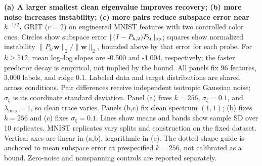 \textbf{(a) A larger smallest clean eigenvalue improves recovery; (b) more noise increases instability; (c) more pairs reduce subspace error near $k^{-1/2}$.} GRIT ($r=2$) on engineered MNIST features with two controlled color cues. Circles show subspace error $\|(I-P_{k,2})P_{\mathcal U}\|_{\rm op}$; squares show normalized instability $\|P_{\mathcal U}\boldsymbol w\|_2/\|\boldsymbol w\|_2$, bounded above by that error for each probe. For $k\ge512$, mean log--log slopes are -0.500 and -1.004, respectively; the faster predictor decay is empirical, not implied by the bound. All panels fix 96 features, 3,000 labels, and ridge $0.1$. Labeled data and target distributions are shared across conditions. Pair differences receive independent isotropic Gaussian noise; $\sigma_\xi$ is its coordinate standard deviation. Panel (a) fixes $k=256$, $\sigma_\xi=0.1$, and $\lambda_{\max}=1$, so clean trace varies. Panels (b,c) fix clean spectrum $(1,1)$; (b) fixes $k=256$ and (c) fixes $\sigma_\xi=0.1$. Lines show means and bands show sample SD over 10 replicates. MNIST replicates vary splits and construction on the fixed dataset. Vertical axes are linear in (a,b), logarithmic in (c). The dotted shape guide is anchored to mean subspace error at prespecified $k=256$, not calibrated as a bound. Zero-noise and nonspanning controls are reported separately. 
